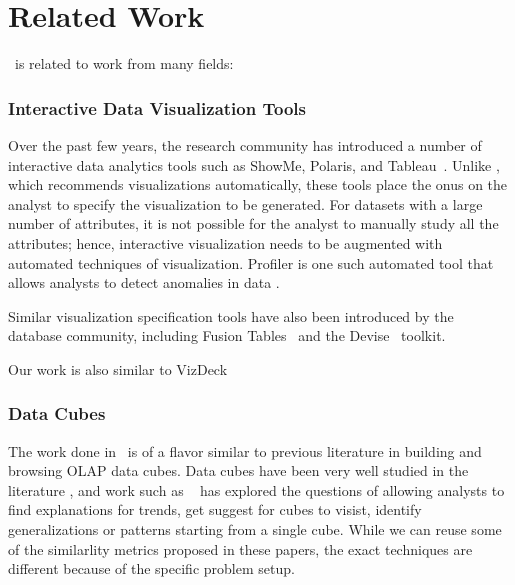 

\section{Related Work}
\label{sec:related_work}

\SeeDB\ is related to work from many fields:

\subsubsection*{Interactive Data Visualization Tools}
Over the past few years, the research community has introduced a number of
interactive data analytics tools such as ShowMe, Polaris, and 
Tableau~\cite{DBLP:journals/cacm/StolteTH08, DBLP:journals/tvcg/MackinlayHS07}.
Unlike \SeeDB, which recommends visualizations automatically, these tools place
the onus on the analyst to specify the visualization to be generated.
For datasets with a large number of attributes, it is not possible
for the analyst to manually study all the attributes; hence, interactive
visualization needs to be augmented with automated techniques of visualization.
Profiler is one such automated tool that allows analysts to detect anomalies in
data \cite{DBLP:conf/AVI/KandelPPHH12}.

Similar visualization specification tools have also been introduced by the
database community, including Fusion
Tables~\cite{DBLP:conf/sigmod/GonzalezHJLMSSG10} and the
Devise~\cite{DBLP:conf/sigmod/LivnyRBCDLMW97} toolkit.

Our work is also similar to VizDeck 

\subsubsection*{Data Cubes}
The work done in \SeeDB\ is of a flavor similar to previous literature in
building and browsing OLAP data cubes. Data cubes have been very well studied in
the literature \cite{DBLP:conf/SIGMOD/HarinarayanRU96,
DBLP:jounral/DMKD/GrayCBLR97}, and work such as
~\cite{DBLP:conf/vldb/Sarawagi99, DBLP:conf/vldb/SatheS01,
DBLP:conf/vldb/Sarawagi00, DBLP:conf/SIGKDD/OrdonezC09} has explored the
questions of allowing analysts to find explanations for trends, get suggest for
cubes to visist, identify generalizations or patterns starting from a single
cube. While we can reuse some of the similarlity metrics proposed in these
papers, the exact techniques are different because of the specific problem
setup.

